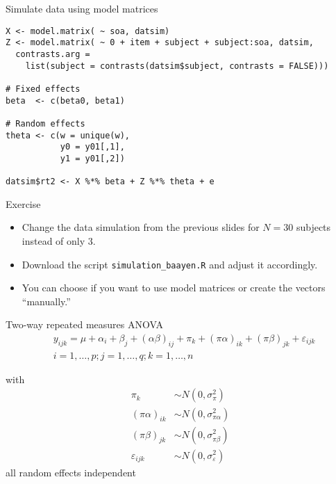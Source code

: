 \documentclass[aspectratio=169]{beamer}
\begin{document}
{

\begin{frame}[fragile]{Simulate data using model matrices}
  \begin{lstlisting}
X <- model.matrix( ~ soa, datsim)
Z <- model.matrix( ~ 0 + item + subject + subject:soa, datsim,
  contrasts.arg = 
    list(subject = contrasts(datsim$subject, contrasts = FALSE)))

# Fixed effects
beta  <- c(beta0, beta1)

# Random effects
theta <- c(w = unique(w),
           y0 = y01[,1],
           y1 = y01[,2])

datsim$rt2 <- X %*% beta + Z %*% theta + e
  \end{lstlisting}
\end{frame}

}

\begin{frame}[fragile]{}
  \begin{block}{Exercise}
    \begin{itemize}
      \item Change the data simulation from the previous slides for $N =
        30$ subjects instead of only 3.
      \item Download the script \verb+simulation_baayen.R+ and adjust it
        accordingly.
      \item You can choose if you want to use model matrices or create
        the vectors ``manually.''
    \end{itemize}
  \end{block}
\end{frame}


\begin{frame}{Two-way repeated measures ANOVA}
  \begin{align*}
    &   y_{ijk} = \mu + \alpha_i + \beta_j + (\alpha\beta)_{ij} + \pi_k +
        (\pi\alpha)_{ik} + (\pi\beta)_{jk} + \varepsilon_{ijk}\\
    &  i = 1,\dots,p; j = 1,\dots,q; k = 1,\dots,n
  \end{align*}

     with
  \begin{align*}
    \pi_k & \sim N(0, \sigma^2_{\pi})\\
    (\pi\alpha)_{ik} & \sim N(0, \sigma^2_{\pi\alpha})\\
    (\pi\beta)_{jk} & \sim N(0, \sigma^2_{\pi\beta})\\
    \varepsilon_{ijk} & \sim N(0, \sigma^2_{\varepsilon})
  \end{align*}
     all random effects independent
\vfill
\end{frame}
\end{document}
